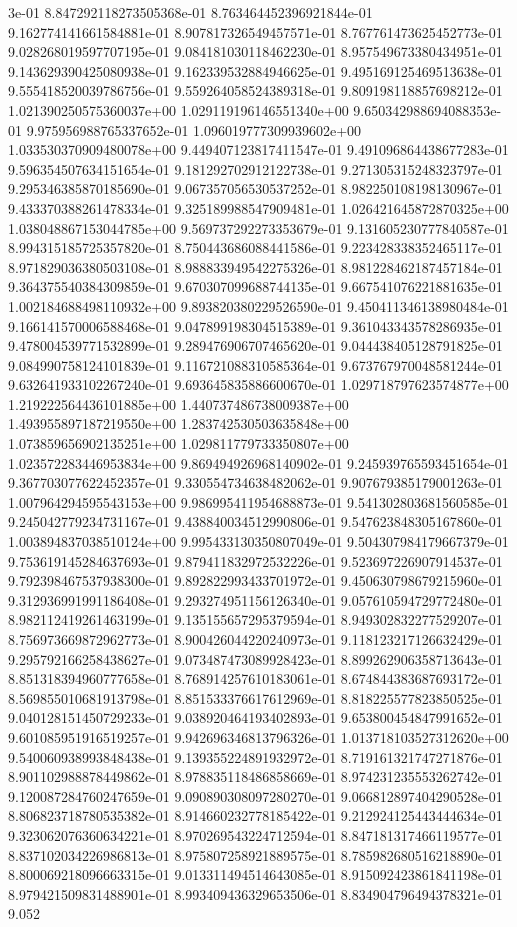 3e-01	8.847292118273505368e-01	8.763464452396921844e-01	9.162774141661584881e-01	8.907817326549457571e-01	8.767761473625452773e-01	9.028268019597707195e-01	9.084181030118462230e-01	8.957549673380434951e-01	9.143629390425080938e-01	9.162339532884946625e-01	9.495169125469513638e-01	9.555418520039786756e-01	9.559264058524389318e-01	9.809198118857698212e-01	1.021390250575360037e+00	1.029119196146551340e+00	9.650342988694088353e-01	9.975956988765337652e-01	1.096019777309939602e+00	1.033530370909480078e+00	9.449407123817411547e-01	9.491096864438677283e-01	9.596354507634151654e-01	9.181292702912122738e-01	9.271305315248323797e-01	9.295346385870185690e-01	9.067357056530537252e-01	8.982250108198130967e-01	9.433370388261478334e-01	9.325189988547909481e-01	1.026421645872870325e+00	1.038048867153044785e+00	9.569737292273353679e-01	9.131605230777840587e-01	8.994315185725357820e-01	8.750443686088441586e-01	9.223428338352465117e-01	8.971829036380503108e-01	8.988833949542275326e-01	8.981228462187457184e-01	9.364375540384309859e-01	9.670307099688744135e-01	9.667541076221881635e-01	1.002184688498110932e+00	9.893820380229526590e-01	9.450411346138980484e-01	9.166141570006588468e-01	9.047899198304515389e-01	9.361043343578286935e-01	9.478004539771532899e-01	9.289476906707465620e-01	9.044438405128791825e-01	9.084990758124101839e-01	9.116721088310585364e-01	9.673767970048581244e-01	9.632641933102267240e-01	9.693645835886600670e-01	1.029718797623574877e+00	1.219222564436101885e+00	1.440737486738009387e+00	1.493955897187219550e+00	1.283742530503635848e+00	1.073859656902135251e+00	1.029811779733350807e+00	1.023572283446953834e+00	9.869494926968140902e-01	9.245939765593451654e-01	9.367703077622452357e-01	9.330554734638482062e-01	9.907679385179001263e-01	1.007964294595543153e+00	9.986995411954688873e-01	9.541302803681560585e-01	9.245042779234731167e-01	9.438840034512990806e-01	9.547623848305167860e-01	1.003894837038510124e+00	9.995433130350807049e-01	9.504307984179667379e-01	9.753619145284637693e-01	9.879411832972532226e-01	9.523697226907914537e-01	9.792398467537938300e-01	9.892822993433701972e-01	9.450630798679215960e-01	9.312936991991186408e-01	9.293274951156126340e-01	9.057610594729772480e-01	8.982112419261463199e-01	9.135155657295379594e-01	8.949302832277529207e-01	8.756973669872962773e-01	8.900426044220240973e-01	9.118123217126632429e-01	9.295792166258438627e-01	9.073487473089928423e-01	8.899262906358713643e-01	8.851318394960777658e-01	8.768914257610183061e-01	8.674844383687693172e-01	8.569855010681913798e-01	8.851533376617612969e-01	8.818225577823850525e-01	9.040128151450729233e-01	9.038920464193402893e-01	9.653800454847991652e-01	9.601085951916519257e-01	9.942696346813796326e-01	1.013718103527312620e+00	9.540060938993848438e-01	9.139355224891932972e-01	8.719161321747271876e-01	8.901102988878449862e-01	8.978835118486858669e-01	8.974231235553262742e-01	9.120087284760247659e-01	9.090890308097280270e-01	9.066812897404290528e-01	8.806823718780535382e-01	8.914660232778185422e-01	9.212924125443444634e-01	9.323062076360634221e-01	8.970269543224712594e-01	8.847181317466119577e-01	8.837102034226986813e-01	8.975807258921889575e-01	8.785982680516218890e-01	8.800069218096663315e-01	9.013311494514643085e-01	8.915092423861841198e-01	8.979421509831488901e-01	8.993409436329653506e-01	8.834904796494378321e-01	9.052